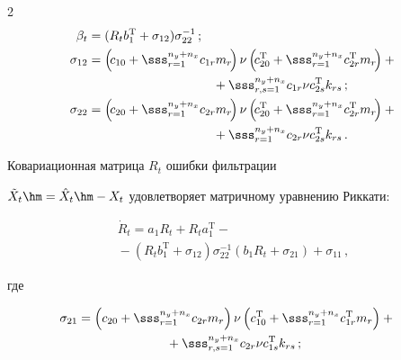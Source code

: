 \begin{multicols}{2}
\begin{align}
\beta_t &= (R_t b_1^{\mathrm{T}} +\sigma_{12}) \sigma_{22}^{-1}\,;\notag\\ %

\sigma_{12}&=\left(\! c_{10} +\sss_{r=1}^{n_y+n_x} c_{1r} m_{r}\!\right) \nu

\left( \!c_{20}^{\mathrm{T}} +\sss_{r=1}^{n_y+n_x} c_{2r}^{\mathrm{T}} m_{r}\!\right)+{}\notag\\

&\hspace*{35mm}{}+\sss_{r,s=1}^{n_y+n_x} c_{1r}\nu c_{2s}^{\mathrm{T}}  k_{rs}\,; \notag\\ %

\sigma_{22}&=\left(\! c_{20} +\sss_{r=1}^{n_y+n_x} c_{2r} m_{r}\!\right)\nu

    \left(\! c_{20}^{\mathrm{T}} +\sss_{r=1}^{n_y+n_x} c_{2r}^{\mathrm{T}} m_{r}\!\right)+{}\notag\\

&\hspace*{35mm}{}+    \sss_{r=1}^{n_y+n_x} c_{2r}\nu c_{2s}^{\mathrm{T}} k_{rs}\,.\label{e2.7-sk}

    \end{align}

Ковариационная матрица  $R_t$ ошибки фильтрации

$\tilde X_t\hm=\hat X_t \hm-X_t$ удовлетворяет матричному уравнению Риккати:

\begin{multline}

\dot R_t = a_1 R_t + R_t a_1^{\mathrm{T}} - {}\\

{}-(R_t b_1^{\mathrm{T}} +\sigma_{12} )

\sigma_{22}^{-1} (b_1 R_t +\sigma_{21}) +\sigma_{11}\,,\label{e2.8-sk}

\end{multline}

где

\begin{multline*}

\hspace*{-9.60526pt}\sigma_{21}= \left( c_{20} +\sss_{r=1}^{n_y+n_x} c_{2r} m_{r}\right)

     \nu  \left( c_{10}^{\mathrm{T}} +\sss_{r=1}^{n_y+n_x} c_{1r}^{\mathrm{T}} m_{r}\right)+{}\\

{}+\sss_{r,s=1}^{n_y+n_x} c_{2r}\nu c_{1s}^{\mathrm{T}} k_{rs}\,;


\end{multline*}
\end{multicols}
